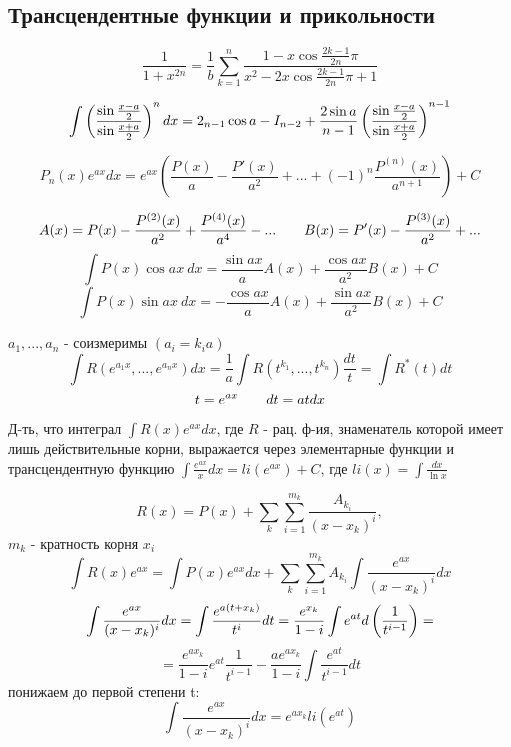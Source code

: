 \documentclass[main]{subfiles}
\begin{document}
    \newpage
    \subsection{Трансцендентные функции и прикольности}
    \begin{Upr}
        \[\frac{1}{1 + x^{2n}} = \frac{1}{b} \sum_{k=1}^n \frac{1 - x \cos \frac{2k-1}{2n}\pi}{x^2 - 2 x \cos \frac{2k-1}{2n}\pi + 1}\]
    \end{Upr}

    \begin{Upr}
        \[\int \left(\frac{\sin \frac{x - a}{2}}{\sin \frac{x + a}{2}}\right)^n dx = 2 _{n-1} \cos a - I_{n -2} + \frac{2\sin a}{n-1} \left(\frac{\sin \frac{x - a}{2}}{\sin \frac{x + a}{2}}\right)^{n-1}\]
    \end{Upr}

    \begin{Upr}
        \[P_n(x) e^{ax} dx = e^{ax} (\frac{P(x)}{a} - \frac{P'(x)}{a^2} + ... + (-1)^n \frac{P^{(n)}(x)}{a^{n+1}}) + C\]
    \end{Upr}

    \begin{Upr}
        \[A(x) = P(x) - \frac{P^{(2)}(x)}{a^2} + \frac{P^{(4)}(x)}{a^4} - ... \qquad B(x) = P'(x) - \frac{P^{(3)}(x)}{a^2} + ...\]
        \[\int P(x) \cos ax\ dx = \frac{\sin ax}{a} A(x) + \frac{\cos ax}{a^2} B(x) + C\]
        \[\int P(x) \sin ax \ dx = - \frac{\cos ax}{a} A(x) + \frac{\sin ax}{a^2} B(x) + C\]
    \end{Upr}

    \begin{example}
        $a_1,...,a_n$ - соизмеримы $(a_i = k_i a)$
        \[\int R(e^{a_1 x},...,e^{a_n x}) dx = \frac{1}{a} \int R(t^{k_1},...,t^{k_n}) \frac{dt}{t} = \int R^*(t) dt\]
        \[t = e^{ax} \qquad dt = at dx\]
    \end{example}

    \begin{task}
        Д-ть, что интеграл $\int R(x) e^{ax} dx$, где $R$ - рац. ф-ия, знаменатель которой имеет лишь действительные корни, выражается через элементарные функции и трансцендентную функцию $\int \frac{e^{ax}}{x} dx = li(e^{ax}) + C$, где $li(x) = \int \frac{dx}{\ln x}$
    \end{task}

    \begin{Sol}
        \[R(x) = P(x) + \sum_k \sum_{i = 1}^{m_k} \frac{A_{k_i}}{(x - x_k)^i},\]
        $m_k$ - кратность корня $x_i$
        \[\int R(x) e^{ax} = \int P(x) e^{ax} dx + \sum_k \sum_{i=1}^{m_k} A_{k_i} \int \frac{e^{ax}}{(x - x_k)^i} dx\]
        \[\int \frac{e^{ax}}{(x - x_k)^i} dx = \int \frac{e^{a(t + x_k)}}{t^i} dt = \frac{e^{x_k}}{1 - i} \int e^{at} d\left(\frac{1}{t^{i-1}}\right) =\]
        \[= \frac{e^{a x_k}}{1 - i} e^{at} \frac{1}{t^{i-1}} - \frac{a e^{a x_k}}{1 - i} \int \frac{e^{at}}{t^{i-1}}dt\]
        понижаем до первой степени t:
        \[\int \frac{e^{ax}}{(x - x_k)^i} dx = e^{ax_k} li(e^{at})\]
    \end{Sol}
\end{document}
